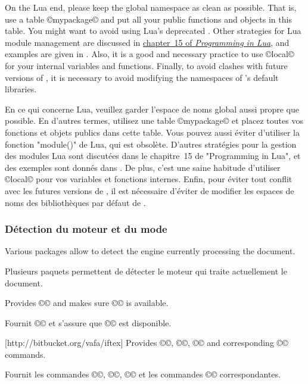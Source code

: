 \documentclass{lltxdoc}
\begin{document}
On the Lua end, please keep the global namespace as clean as possible. That
is, use a table ©mypackage© and put all your public functions and objects in
this table. You might want to avoid using Lua's deprecated .
Other strategies for Lua module management are discussed in
\href{http://www.lua.org/pil/15.html}{chapter~15 of \emph{Programming in
Lua}}, and examples are given in . Also, it
is a good and necessary practice to use ©local© for your internal variables and
functions. Finally, to avoid clashes with future versions of \luatex, it is
necessary to avoid modifying the namespaces of \luatex's default libraries.

En ce qui concerne Lua, veuillez garder l'espace de noms global aussi propre que possible. En d'autres termes, utilisez une table ©mypackage© et placez toutes vos fonctions et objets publics dans cette table. Vous pouvez aussi éviter d'utiliser la fonction "module()" de Lua, qui est obsolète. D'autres stratégies pour la gestion des modules Lua sont discutées dans le chapitre~15 de "Programming in Lua", et des exemples sont donnés dans . De plus, c'est une saine habitude d'utiliser ©local© pour vos variables et fonctions internes. Enfin, pour éviter tout conflit avec les futures versions de \luatex, il est nécessaire d'éviter de modifier les espaces de noms des bibliothèques par défaut de \luatex.

\subsubsection{Détection du moteur et du mode}\label{detect}

Various packages allow to detect the engine currently processing the document.

Plusieurs paquets permettent de détecter le moteur qui traite actuellement le document.

Provides ©\ifluatex© and makes sure ©\luatexversion© is available.

Fournit ©\ifluatex© et s'assure que ©\luatexversion© est disponible.

[http://bitbucket.org/vafa/iftex]
Provides ©\ifPDFTeX©, ©\ifXeTeX©, ©\ifLuaTeX© and corresponding ©\Require©
commands.

Fournit les commandes ©\ifPDFTeX©, ©\ifXeTeX©, ©\ifLuaTeX© et les commandes ©\Require© correspondantes.
\end{document}
